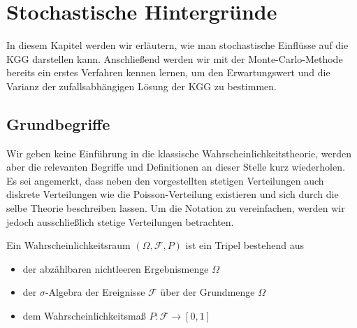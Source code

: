 
\chapter{Stochastische Hintergründe}
In diesem Kapitel werden wir erläutern, wie man stochastische Einflüsse auf die KGG darstellen kann. Anschließend werden wir mit der Monte-Carlo-Methode bereits ein erstes Verfahren kennen lernen, um den Erwartungswert und die Varianz der zufallsabhängigen Lösung der KGG zu bestimmen.


\section{Grundbegriffe}
Wir geben keine Einführung in die klassische Wahrscheinlichkeitstheorie, werden aber die relevanten Begriffe und Definitionen an dieser Stelle kurz wiederholen. Es sei angemerkt, dass neben den vorgestellten stetigen Verteilungen auch diskrete Verteilungen wie die Poisson-Verteilung existieren und sich durch die selbe Theorie beschreiben lassen. Um die Notation zu vereinfachen, werden wir jedoch ausschließlich stetige Verteilungen betrachten.

\begin{mathdef}[Wahrscheinlichkeitsraum]
Ein Wahrscheinlichkeitsraum $(\Omega,\mathcal{F},P)$ ist ein Tripel bestehend aus 
\begin{itemize}
\item der abzählbaren nichtleeren Ergebnismenge $\Omega$
\item der $\sigma$-Algebra der Ereignisse $\mathcal{F}$ über der Grundmenge $\Omega$
\item dem Wahrscheinlichkeitsmaß $P\colon\mathcal{F}\to [0,1]$
\end{itemize}
\end{mathdef}

